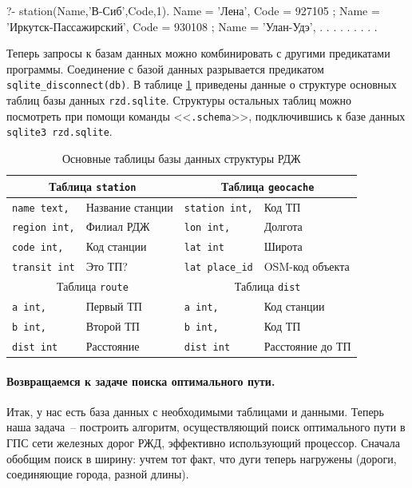\documentclass[a4paper,14pt, openany, twoside, draft]{extbook} %
\begin{document}
\begin{proexp}
?- station(Name,'В-Сиб',Code,1).
Name = 'Лена',
Code = 927105 ;
Name = 'Иркутск-Пассажирский',
Code = 930108 ;
Name = 'Улан-Удэ',
. . . . . . . . .
\end{proexp}


Теперь запросы к базам данных можно комбинировать с другими предикатами программы.  Соединение с базой данных разрывается предикатом \texttt{sqlite\_disconnect(db)}.  В таблице \ref{tab:dbstruct} приведены данные о структуре основных таблиц базы данных \texttt{rzd.sqlite}.  Структуры остальных таблиц можно посмотреть при помощи команды <<\texttt{.schema}>>, подключившись к базе данных \texttt{sqlite3 rzd.sqlite}.
\begin{table}[hbt]
\begin{center}\small
\caption{Основные таблицы базы данных структуры РДЖ} \label{tab:dbstruct}
\begin{tabular}{|l|l||l|l|}
 \hline
\multicolumn{2}{|c||}{Таблица \texttt{station}} & \multicolumn{2}{c|}{Таблица \texttt{geocache}} \\
\hline
\texttt{name text,} & Название станции & \texttt{station int,} & Код ТП \\
\hline
\texttt{region int,} & Филиал РДЖ & \texttt{lon int,} & Долгота \\
\hline
\texttt{code int,} & Код станции & \texttt{lat int} & Широта \\
\hline
\texttt{transit int} & Это ТП? & \texttt{lat place\_id} & OSM-код объекта \\
  \hline
\multicolumn{2}{|c||}{Таблица \texttt{route}} & \multicolumn{2}{c|}{Таблица \texttt{dist}} \\
  \hline
\texttt{a int,} & Первый ТП & \texttt{a int,} & Код станции \\
\hline
\texttt{b int,} & Второй ТП & \texttt{b int,} & Код ТП \\
\hline
\texttt{dist int} & Расстояние & \texttt{dist int} & Расстояние до ТП \\
\hline
\end{tabular}
\end{center}
\end{table}

\paragraph{Возвращаемся к задаче поиска оптимального пути.} \label{par:informedcont} Итак, у нас есть база данных с необходимыми таблицами и данными.  Теперь наша задача~-- построить алгоритм, осуществляющий поиск оптимального пути в ГПС сети железных дорог РЖД, эффективно использующий процессор.  Сначала обобщим поиск в ширину: учтем тот факт, что дуги теперь нагружены (дороги, соединяющие города, разной длины).
\end{document}
